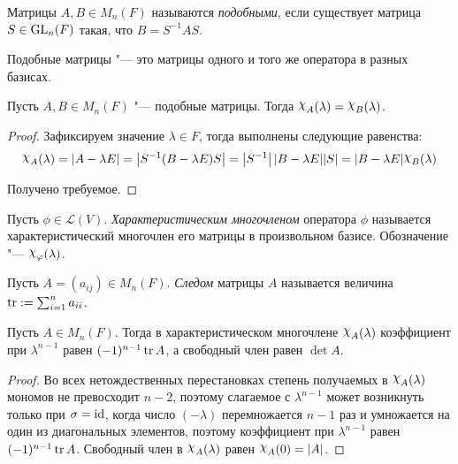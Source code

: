 \begin{definition}
	Матрицы $A, B \in M_n(F)$ называются \textit{подобными}, если существует матрица $S \in \operatorname{GL}_n(F)$ такая, что $B = S^{-1}AS$.
\end{definition}

\begin{note}
	Подобные матрицы "--- это матрицы одного и того же оператора в разных базисах.
\end{note}

\begin{proposition}
	Пусть $A, B \in M_n(F)$ "--- подобные матрицы. Тогда $\Chi_A(\lambda) = \Chi_B(\lambda)$.
\end{proposition}

\begin{proof}
	Зафиксируем значение $\lambda \in F$, тогда выполнены следующие равенства:
	\[\Chi_A(\lambda) = |A - \lambda E| = \left|S^{-1}(B - \lambda E)S\right| = \left|S^{-1}\right||B - \lambda E||S| = |B - \lambda E| \Chi_B(\lambda)\]
	
	Получено требуемое.
\end{proof}

\begin{definition}
	Пусть $\phi \in \mathcal{L}(V)$. \textit{Характеристическим многочленом} оператора $\phi$ называется характеристический многочлен его матрицы в произвольном базисе. Обозначение "--- $\Chi_\phi(\lambda)$.
\end{definition}

\begin{definition}
	Пусть $A = (a_{ij}) \in M_n(F)$. \textit{Следом} матрицы $A$ называется величина $\operatorname{tr} := \sum_{i = 1}^na_{ii}$.
\end{definition}

\begin{proposition}
	Пусть $A \in M_n(F)$. Тогда в характеристическом многочлене $\Chi_A(\lambda)$ коэффициент при $\lambda^{n - 1}$ равен $(-1)^{n - 1}\operatorname{tr}{A}$, а свободный член равен $\det{A}$.
\end{proposition}

\begin{proof}
	Во всех нетождественных перестановках степень получаемых в $\Chi_A(\lambda)$ мономов не превосходит $n - 2$, поэтому слагаемое с $\lambda^{n - 1}$ может возникнуть только при $\sigma = \mathrm{id}$, когда число $(-\lambda)$ перемножается $n - 1$ раз и умножается на один из диагональных элементов, поэтому коэффициент при $\lambda^{n - 1}$ равен $(-1)^{n - 1}\operatorname{tr}{A}$. Свободный член в $\Chi_A(\lambda)$ равен $\Chi_A(0) = |A|$.
\end{proof}

